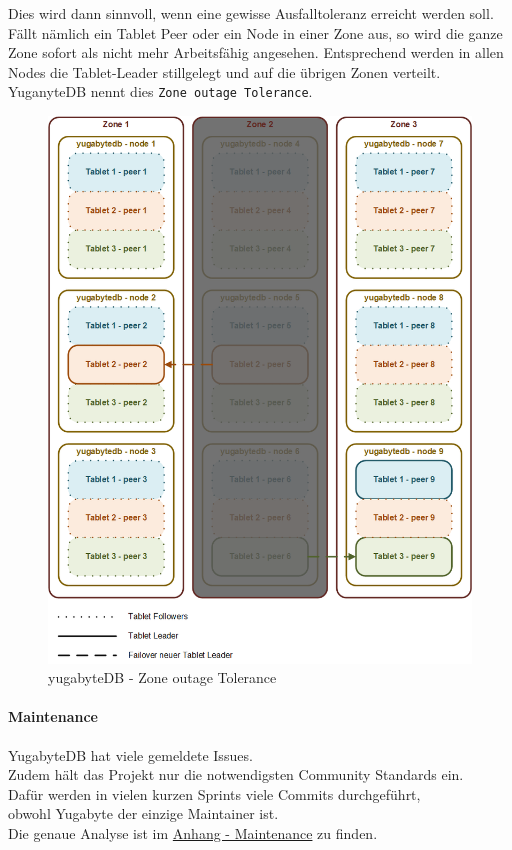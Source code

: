 \begin{flushleft}
    Dies wird dann sinnvoll, wenn eine gewisse Ausfalltoleranz erreicht werden soll.
    Fällt nämlich ein Tablet Peer oder ein Node in einer Zone aus, so wird die ganze Zone sofort als nicht mehr Arbeitsfähig angesehen.
    Entsprechend werden in allen Nodes die Tablet-Leader stillgelegt und auf die übrigen Zonen verteilt.
    YuganyteDB nennt dies \texttt{Zone outage Tolerance}\cite{PTKCP8A4}.
    \begin{figure}[H]
        \centering
        \includegraphics[width=0.8\linewidth]{source/implementation/evaluation/postgresql_ha_solutions/yugabytedb/yugabytedb-zone-outage-tolerance}
        \caption{yugabyteDB - Zone outage Tolerance}
        \label{fig:yugabytedb-zone-outage-tolerance}
    \end{figure}
\end{flushleft}
\begin{flushleft}
    \paragraph{Maintenance}
    YugabyteDB hat viele gemeldete Issues.\\
    Zudem hält das Projekt nur die notwendigsten Community Standards ein.\\
    Dafür werden in vielen kurzen Sprints viele Commits durchgeführt,\\
    obwohl Yugabyte der einzige Maintainer ist.\\
    Die genaue Analyse ist im \hyperref[subsec:maintenance_patroni]{Anhang - Maintenance} zu finden.
\end{flushleft}
